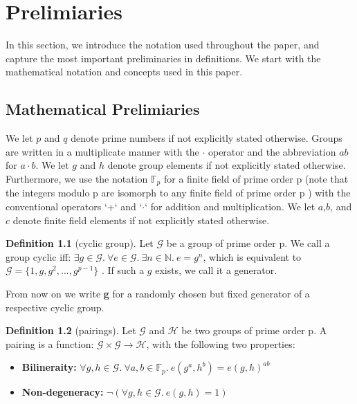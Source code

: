 \chapter{Prelimiaries}\label{chapter:prelimiaries}

\theoremstyle{definition}
\newtheorem{definition}{Definition}[section]

\theoremstyle{remark}
\newtheorem{example}{Example}[section]

In this section, we introduce the notation used throughout the paper, and capture the most important preliminaries in definitions. We start with the mathematical notation and concepts used in this paper.

\section{Mathematical Prelimiaries}

We let $p$ and $q$ denote prime numbers if not explicitly stated otherwise. 
Groups are written in a multiplicate manner with the  $\cdot$ operator and the abbreviation $ab$ for $a \cdot b$. We let $g$ and $h$ denote group elements if not explicitly stated otherwise.
Furthermore, we use the notation $\mathbb{F}_p$ for a finite field of prime order p (note that the integers modulo p are isomorph to any finite field of prime order p \parencite{algebra}) with the conventional operators `+` and `$\cdot$` for addition and multiplication. We let $a$,$b$, and $c$ denote finite field elements if not explicitly stated otherwise.

\begin{definition}[cyclic group]
Let $\mathcal{G}$ be a group of prime order p. We call a group cyclic iff: $\exists g \in \mathcal{G}. \ \forall e \in \mathcal{G}. \ \exists n \in \mathbb{N}. \ e = g^n$, which is equivalent to $\mathcal{G} = \{1,g,g^2,...,g^{p-1}\}$ \parencite{algebra}. If such a $g$ exists, we call it a generator.

From now on we write \textbf{g} for a randomly chosen but fixed generator of a respective cyclic group. 
\end{definition}

\begin{definition}[pairings]
    \label{pairings_def}
    Let $\mathcal{G}$ and $\mathcal{H}$ be two groups of prime order p. A pairing is a function: $\mathcal{G} \times \mathcal{G} \rightarrow \mathcal{H}$, with the following two properties:
    \begin{itemize}
        \item \textbf{Bilineraity:} $\forall g,h \in \mathcal{G}. \ \forall a,b \in \mathbb{F}_p. \ e(g^a,h^b) = e(g,h)^{ab}$
        \item \textbf{Non-degeneracy:} $\neg (\forall g,h \in \mathcal{G}. \ e(g,h)=1)$
    \end{itemize}
    \parencite{KZG}
\end{definition}

